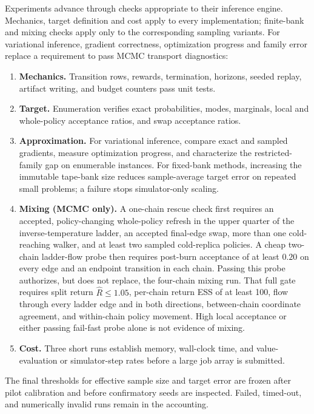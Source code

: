 Experiments advance through checks appropriate to their inference engine.
Mechanics, target definition and cost apply to every implementation; finite-bank
and mixing checks apply only to the corresponding sampling variants. For
variational inference, gradient correctness, optimization progress and family
error replace a requirement to pass MCMC transport diagnostics:
\begin{enumerate}[label=G\arabic*.]
  \item \textbf{Mechanics.} Transition rows, rewards, termination, horizons,
        seeded replay, artifact writing, and budget counters pass unit tests.
  \item \textbf{Target.} Enumeration verifies exact probabilities, modes,
        marginals, local and whole-policy acceptance ratios, and swap
        acceptance ratios.
  \item \textbf{Approximation.} For variational inference, compare exact and
        sampled gradients, measure optimization progress, and characterize the
        restricted-family gap on enumerable instances. For fixed-bank methods,
        increasing the immutable tape-bank size
        reduces sample-average target error on repeated small problems; a
        failure stops simulator-only scaling.
  \item \textbf{Mixing (MCMC only).} A one-chain rescue check first requires an accepted,
        policy-changing whole-policy refresh in the upper quarter of the
        inverse-temperature ladder, an accepted final-edge swap,
        more than one cold-reaching walker, and at least two sampled cold-replica
        policies.  A cheap two-chain ladder-flow
        probe then requires
        post-burn acceptance of at least \(0.20\) on every edge and an endpoint
        transition in each chain.  Passing this probe authorizes, but does not
        replace, the four-chain mixing run.  That full gate requires split
        return \(\widehat R\leq1.05\), per-chain return ESS of at least 100,
        flow through every ladder edge and in both directions, between-chain
        coordinate agreement, and within-chain policy movement.  High local
        acceptance or either passing fail-fast probe alone is not evidence of
        mixing.
  \item \textbf{Cost.} Three short runs establish memory, wall-clock time, and
        value-evaluation or simulator-step rates before a large job array is
        submitted.
\end{enumerate}

The final thresholds for effective sample size and target error are frozen
after pilot calibration and before confirmatory seeds are inspected.  Failed,
timed-out, and numerically invalid runs remain in the accounting.
